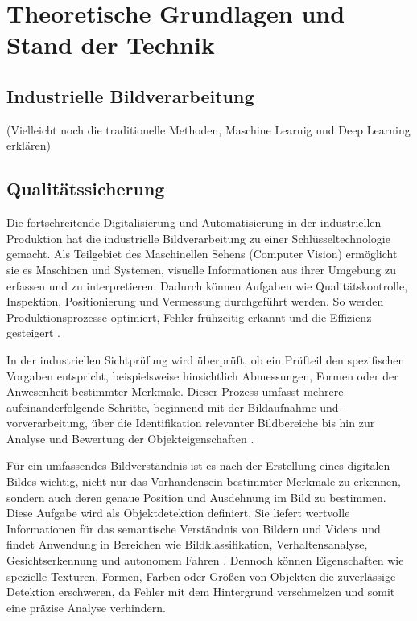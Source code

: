 \chapter{Theoretische Grundlagen und Stand der Technik}\label{sec:stand_der_technik}

\section{Industrielle Bildverarbeitung}
 (Vielleicht noch die traditionelle Methoden, Maschine Learnig und Deep Learning erklären)
 
\section{Qualitätssicherung}
Die fortschreitende Digitalisierung und Automatisierung in der industriellen Produktion hat die industrielle Bildverarbeitung zu einer Schlüsseltechnologie gemacht. Als Teilgebiet des Maschinellen Sehens (Computer Vision) ermöglicht sie es Maschinen und Systemen, visuelle Informationen aus ihrer Umgebung zu erfassen und zu interpretieren. Dadurch können Aufgaben wie Qualitätskontrolle, Inspektion, Positionierung und Vermessung durchgeführt werden. So werden Produktionsprozesse optimiert, Fehler frühzeitig erkannt und die Effizienz gesteigert \cite{cognex_grundlagen_nodate}.

In der industriellen Sichtprüfung wird überprüft, ob ein Prüfteil den spezifischen Vorgaben entspricht, beispielsweise hinsichtlich Abmessungen, Formen oder der Anwesenheit bestimmter Merkmale. Dieser Prozess umfasst mehrere aufeinanderfolgende Schritte, beginnend mit der Bildaufnahme und -vorverarbeitung, über die Identifikation relevanter Bildbereiche bis hin zur Analyse und Bewertung der Objekteigenschaften \cite[S. 15–16]{demant_industrielle_2011}.

Für ein umfassendes Bildverständnis ist es nach der Erstellung eines digitalen Bildes wichtig, nicht nur das Vorhandensein bestimmter Merkmale zu erkennen, sondern auch deren genaue Position und Ausdehnung im Bild zu bestimmen. Diese Aufgabe wird als Objektdetektion definiert. Sie liefert wertvolle Informationen für das semantische Verständnis von Bildern und Videos und findet Anwendung in Bereichen wie Bildklassifikation, Verhaltensanalyse, Gesichtserkennung und autonomem Fahren \cite{zhao_object_2019}. Dennoch können Eigenschaften wie spezielle Texturen, Formen, Farben oder Größen von Objekten die zuverlässige Detektion erschweren, da Fehler mit dem Hintergrund verschmelzen und somit eine präzise Analyse verhindern.

